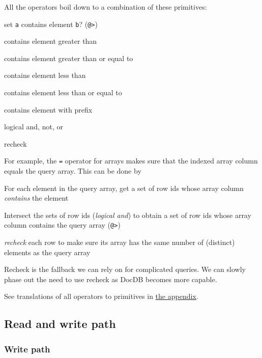\documentclass[11pt]{article}
\begin{document}
All the operators boil down to a combination of these primitives:

\begin{oparts}
\item
  set \texttt{a} contains element \texttt{b}? (\texttt{@\textgreater{}})

  \begin{oparts}
  \item
    contains element greater than
  \item
    contains element greater than or equal to
  \item
    contains element less than
  \item
    contains element less than or equal to
  \item
    contains element with prefix
  \end{oparts}
\item
  logical and, not, or
\item
  recheck
\end{oparts}

For example, the \texttt{=} operator for arrays makes sure that the
indexed array column equals the query array. This can be done by

\begin{nparts}
\item
  For each element in the query array, get a set of row ids whose array
  column \emph{contains} the element
\item
  Intersect the sets of row ids (\emph{logical and}) to obtain a set of
  row ids whose array column contains the query array
  (\texttt{@\textgreater{}})
\item
  \emph{recheck} each row to make sure its array has the same number of
  (distinct) elements as the query array
\end{nparts}

Recheck is the fallback we can rely on for complicated queries. We can
slowly phase out the need to use recheck as DocDB becomes more capable.

See translations of all operators to primitives in
\protect\hyperlink{operators-to-primitives}{the appendix}.

\hypertarget{read-and-write-path}{%
\subsection{Read and write path}\label{read-and-write-path}}

\hypertarget{write-path}{%
\subsubsection{Write path}\label{write-path}}
\end{document}
